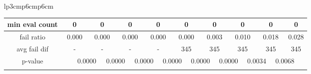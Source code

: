 {\begin{tabular}{lp{3cm}p{6cm}p{6cm}}
\begin{tabular}[h]{m{2.5cm}m{}m{}m{}m{}m{}m{}m{}m{}m{}m{}m{}m{}m{}m{}m{}m{}m{}m{}}
\multicolumn{1}{c}{min eval count}&\multicolumn{2}{c}{          0}&\multicolumn{2}{c}{        0}&\multicolumn{2}{c}{        0}&\multicolumn{2}{c}{        0}&\multicolumn{2}{c}{        0}&\multicolumn{2}{c}{        0}&\multicolumn{2}{c}{        0}&\multicolumn{2}{c}{        0}&\multicolumn{2}{c}{        0}\\
\hline
\multicolumn{1}{c}{fail ratio}&\multicolumn{2}{c}{          0.000}&\multicolumn{2}{c}{    0.000}&\multicolumn{2}{c}{    0.000}&\multicolumn{2}{c}{    0.000}&\multicolumn{2}{c}{    0.000}&\multicolumn{2}{c}{    0.003}&\multicolumn{2}{c}{    0.010}&\multicolumn{2}{c}{    0.018}&\multicolumn{2}{c}{    0.028}\\
\multicolumn{1}{c}{avg fail dif}&\multicolumn{2}{c}{            -}&\multicolumn{2}{c}{        -}&\multicolumn{2}{c}{        -}&\multicolumn{2}{c}{        -}&\multicolumn{2}{c}{      345}&\multicolumn{2}{c}{      345}&\multicolumn{2}{c}{      345}&\multicolumn{2}{c}{      345}&\multicolumn{2}{c}{      345}\\
\hline
\multicolumn{1}{c}{p-value}&&\multicolumn{2}{c}{0.0000}&\multicolumn{2}{c}{0.0000}&\multicolumn{2}{c}{0.0000}&\multicolumn{2}{c}{0.0000}&\multicolumn{2}{c}{0.0000}&\multicolumn{2}{c}{0.0000}&\multicolumn{2}{c}{0.0034}&\multicolumn{2}{c}{0.0068}\\
&&&&&&&&&&&&&&&&&&\end{tabular}
\end{tabular}
}

